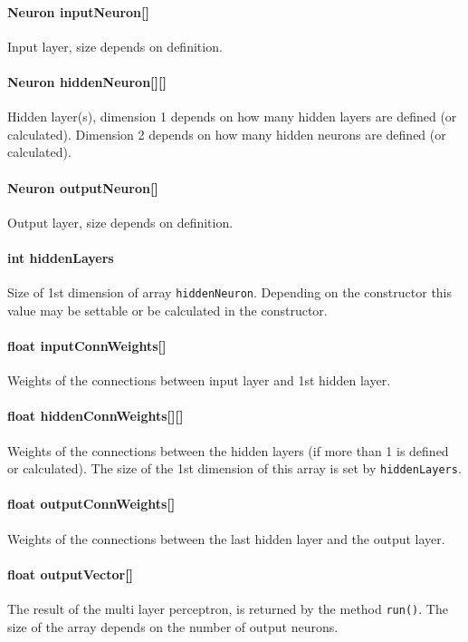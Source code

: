 \paragraph{Neuron inputNeuron[]}
Input layer, size depends on definition.

\paragraph{Neuron hiddenNeuron[][]}
Hidden layer(s), dimension 1 depends on how many hidden layers are defined (or calculated). Dimension 2 depends on how many hidden neurons are defined (or calculated).

\paragraph{Neuron outputNeuron[]}
Output layer, size depends on definition.

\paragraph{int hiddenLayers}
Size of 1st dimension of array \texttt{hiddenNeuron}. Depending on the constructor this value may be settable or be calculated in the constructor.

\paragraph{float inputConnWeights[]}
Weights of the connections between input layer and 1st hidden layer.

\paragraph{float hiddenConnWeights[][]}
Weights of the connections between the hidden layers (if more than 1 is defined or calculated). The size of the 1st dimension of this array is set by \texttt{hiddenLayers}.

\paragraph{float outputConnWeights[]}
Weights of the connections between the last hidden layer and the output layer.

\paragraph{float outputVector[]}
The result of the multi layer perceptron, is returned by the method \texttt{run()}. The size of the array depends on the number of output neurons.

